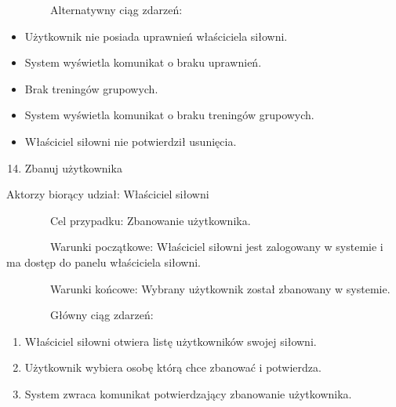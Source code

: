 \documentclass[
]{article}
\providecommand{\tightlist}{%
  \setlength{\itemsep}{0pt}\setlength{\parskip}{0pt}}
\begin{document}
{~~~~~~~~Alternatywny ciąg zdarzeń:}

\begin{itemize}
\tightlist
\item
  {Użytkownik nie posiada uprawnień właściciela siłowni.}
\end{itemize}

\begin{itemize}
\tightlist
\item
  {System wyświetla komunikat o braku uprawnień.}
\end{itemize}

\begin{itemize}
\tightlist
\item
  {Brak treningów grupowych.}
\end{itemize}

\begin{itemize}
\tightlist
\item
  {System wyświetla komunikat o braku treningów grupowych.}
\end{itemize}

\begin{itemize}
\tightlist
\item
  {Właściciel siłowni nie potwierdził usunięcia.\\
  }
\end{itemize}

\begin{enumerate}
\setcounter{enumi}{13}
\tightlist
\item
  {Zbanuj użytkownika}
\end{enumerate}

{Aktorzy biorący udział: Właściciel siłowni}

{~~~~~~~~Cel przypadku: Zbanowanie użytkownika.}

{~~~~~~~~Warunki początkowe: Właściciel siłowni jest zalogowany w
systemie i ma dostęp do panelu właściciela siłowni.}

{~~~~~~~~Warunki końcowe: Wybrany użytkownik został zbanowany w
systemie.}

{~~~~~~~~Główny ciąg zdarzeń:}

\begin{enumerate}
\tightlist
\item
  {Właściciel siłowni otwiera listę użytkowników swojej siłowni.}
\item
  {Użytkownik wybiera osobę którą chce zbanować i potwierdza.}
\item
  {System zwraca komunikat potwierdzający zbanowanie użytkownika.}
\end{enumerate}
\end{document}
